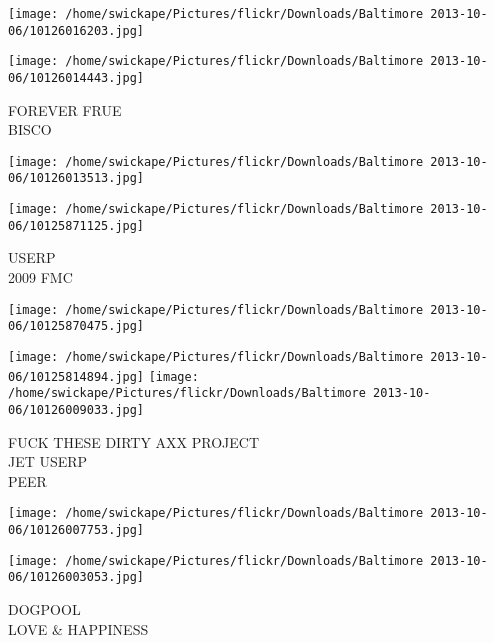 \documentclass[10pt,letterpaper]{article}
\begin{document}
\texttt{[image: /home/swickape/Pictures/flickr/Downloads/Baltimore 2013-10-06/10126016203.jpg]}

\vspace{0.25in}
\texttt{[image: /home/swickape/Pictures/flickr/Downloads/Baltimore 2013-10-06/10126014443.jpg]}

FOREVER FRUE\\
BISCO\\
\pagebreak

\texttt{[image: /home/swickape/Pictures/flickr/Downloads/Baltimore 2013-10-06/10126013513.jpg]}

\vspace{0.25in}
\texttt{[image: /home/swickape/Pictures/flickr/Downloads/Baltimore 2013-10-06/10125871125.jpg]}

USERP\\
2009 FMC\\
\pagebreak

\texttt{[image: /home/swickape/Pictures/flickr/Downloads/Baltimore 2013-10-06/10125870475.jpg]}

\vspace{0.25in}
\texttt{[image: /home/swickape/Pictures/flickr/Downloads/Baltimore 2013-10-06/10125814894.jpg]}
\texttt{[image: /home/swickape/Pictures/flickr/Downloads/Baltimore 2013-10-06/10126009033.jpg]}

FUCK THESE DIRTY AXX PROJECT\\
JET USERP\\
PEER\\
\pagebreak

\texttt{[image: /home/swickape/Pictures/flickr/Downloads/Baltimore 2013-10-06/10126007753.jpg]}

\vspace{0.25in}
\texttt{[image: /home/swickape/Pictures/flickr/Downloads/Baltimore 2013-10-06/10126003053.jpg]}

DOGPOOL\\
LOVE \& HAPPINESS\\
\pagebreak
\end{document}
